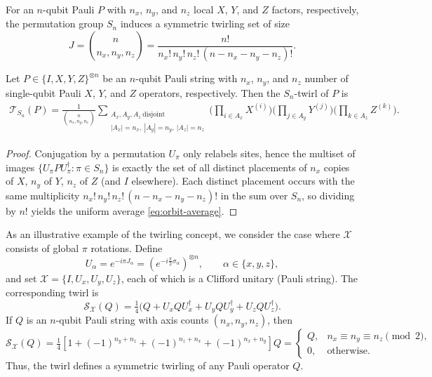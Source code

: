 \documentclass[prl,aps,notitlepage,superscriptaddress,showpacs,nofootinbib]{revtex4-2}
\begin{document}
For an $n$-qubit Pauli $P$ with $n_x$, $n_y$, and $n_z$ local $X$, $Y$, and $Z$ factors, respectively, the permutation group $S_n$ induces a symmetric twirling set of size
\[
    J=\binom{n}{n_x,n_y,n_z}=\frac{n!}{n_x!\,n_y!\,n_z!\,(n-n_x-n_y-n_z)!}.
\]


\begin{theorem}
Let $P\in\{I,X,Y,Z\}^{\otimes n}$ be an $n$-qubit Pauli string with $n_x$, $n_y$, and $n_z$ number of single-qubit Pauli $X$, $Y$, and $Z$ operators, respectively.
Then the $S_n$-twirl of $P$ is
\begin{align}
\mathcal T_{S_n}(P)=\frac{1}{\binom{n}{n_x,n_y,n_z}}
\!\!\!\sum_{\substack{A_x,A_y,A_z\ \mathrm{disjoint}\\ |A_x|=n_x,\ |A_y|=n_y,\ |A_z|=n_z}}
\Bigg(\prod_{i\in A_x} X^{(i)}\Bigg)
\Bigg(\prod_{j\in A_y} Y^{(j)}\Bigg)
\Bigg(\prod_{k\in A_z} Z^{(k)}\Bigg).
\label{eq:orbit-average}
\end{align}
\label{thm:perm_paulis_symmetric_twirl}
\end{theorem}
\begin{proof}
Conjugation by a permutation $U_\pi$ only relabels sites, hence the multiset of images $\{U_\pi P U_\pi^\dagger:\pi\in S_n\}$ is exactly the set of all distinct placements of $n_x$ copies of $X$, $n_y$ of $Y$, $n_z$ of $Z$ (and $I$ elsewhere). Each distinct placement occurs with the same multiplicity $n_x!\,n_y!\,n_z!\,(n-n_x-n_y-n_z)!$ in the sum over $S_n$, so dividing by $n!$ yields the uniform average \eqref{eq:orbit-average}.
\end{proof}

As an illustrative example of the twirling concept, we consider the case where $\mathcal{X}$ consists of global $\pi$ rotations.
 Define  
\[
U_\alpha = e^{-i\pi J_\alpha} = \left(e^{-i\frac{\pi}{2}\sigma_\alpha}\right)^{\otimes n}, 
\qquad \alpha \in \{x,y,z\},
\]  
and set $\mathcal{X}=\{I,U_x,U_y,U_z\}$, each of which is a Clifford unitary (Pauli string). The corresponding twirl is  
\[
\mathcal{S}_{\mathcal{X}}(Q) 
= \tfrac{1}{4}\big(Q + U_x Q U_x^\dagger + U_y Q U_y^\dagger + U_z Q U_z^\dagger\big).
\]  
If $Q$ is an $n$-qubit Pauli string with axis counts $(n_x,n_y,n_z)$, then  
\[
\mathcal S_{\mathcal X}(Q)
= \tfrac{1}{4}\!\left[1+(-1)^{n_y+n_z}+(-1)^{n_z+n_x}+(-1)^{n_x+n_y}\right]Q
= \begin{cases}
Q, & n_x \equiv n_y \equiv n_z \pmod{2},\\[4pt]
0, & \text{otherwise}.
\end{cases}
\]  
Thus, the twirl defines a symmetric twirling of any Pauli operator $Q$.
\end{document}
